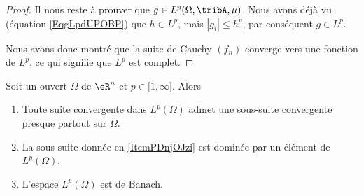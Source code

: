 \begin{proof}
    Il nous reste à prouver que \( g\in L^p(\Omega,\tribA,\mu)\). Nous avons déjà vu (équation \eqref{EqgLpdUPOBP}) que \( h\in L^p\), mais \( | g_i |\leq h^p\), par conséquent  \( g\in L^p\).

    Nous avons donc montré que la suite de Cauchy \( (f_n)\) converge vers une fonction de \( L^p\), ce qui signifie que \( L^p\) est complet.
\end{proof}

\begin{theorem} \label{ThoGVmqOro}
    Soit un ouvert \( \Omega\) de \( \eR^n\) et \( p\in\mathopen[ 1 , \infty \mathclose]\). Alors
    \begin{enumerate}
        \item\label{ItemPDnjOJzi}
            Toute suite convergente dans \( L^p(\Omega)\) admet une sous-suite convergente presque partout sur \( \Omega\).
        \item\label{ItemPDnjOJzii}
            La sous-suite donnée en \ref{ItemPDnjOJzi} est dominée par un élément de \( L^p(\Omega)\).
        \item\label{ItemPDnjOJziii}
            L'espace \( L^p(\Omega)\) est de Banach.
    \end{enumerate}
\end{theorem}

